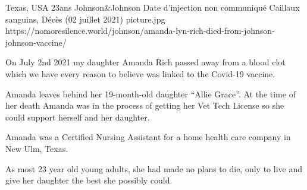           {Texas, USA}
          {23ans}
          {Johnson\&Johnson}
          {Date d'injection non communiqué}
          {Caillaux sanguins,
          Décès (02 juillet 2021)}
          {picture.jpg}
          {https://nomoresilence.world/johnson/amanda-lyn-rich-died-from-johnson-johnson-vaccine/}
          {

On July 2nd 2021 my daughter Amanda Rich passed away from a blood clot which we
have every reason to believe was linked to the Covid-19 vaccine.

Amanda leaves behind her 19-month-old daughter “Allie Grace”. At the time of her
death Amanda was in the process of getting her Vet Tech License so she could
support herself and her daughter.

Amanda was a Certified Nursing Assistant for a home health care company in New
Ulm, Texas.

As most 23 year old young adults, she had made no plans to die, only to live and
give her daughter the best she possibly could.

}
